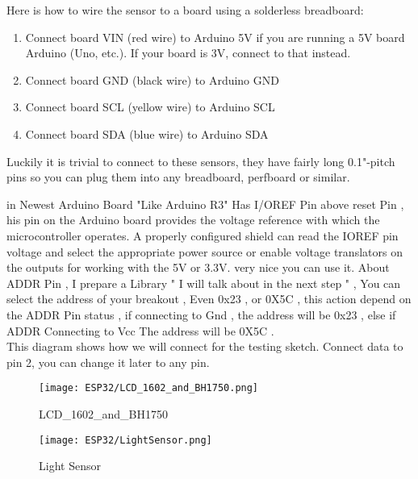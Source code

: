 Here is how to wire the sensor to a board using a solderless breadboard:
\begin{enumerate}
	\item Connect board VIN (red wire) to Arduino 5V if you are running a 5V board Arduino (Uno, etc.). If your board is 3V, connect to that instead.
	\item Connect board GND (black wire) to Arduino GND
	\item Connect board SCL (yellow wire) to Arduino SCL
	\item Connect board SDA (blue wire) to Arduino SDA
\end{enumerate}




Luckily it is trivial to connect to these sensors, they have fairly long 0.1"-pitch pins so you can plug them into any breadboard, perfboard or similar.

in Newest  Arduino Board "Like Arduino R3" Has I/OREF Pin above reset Pin , his pin on the Arduino board provides the voltage reference with which the microcontroller operates. A properly configured shield can read the IOREF pin voltage and select the appropriate power source or enable voltage translators on the outputs for working with the 5V or 3.3V.  very nice you can use it. About ADDR Pin , I prepare a Library " I will talk about in the next step " , You can select the address of your breakout , Even 0x23 \cite{Cihan:2020} , or 0X5C , this action depend on the ADDR Pin status , if connecting to Gnd , the address will be 0x23 , else if ADDR Connecting to Vcc The address will be 0X5C  .
 \\

This diagram shows how we will connect for the testing sketch. Connect data to pin 2, you can change it later to any pin.

\begin{figure}  
	\begin{center}
		\texttt{[image: ESP32/LCD\_1602\_and\_BH1750.png]}
		\caption{LCD_1602_and_BH1750} 
		\label{fig:Python 3.10.}
	\end{center}
\end{figure}	



\begin{figure}  
	\begin{center}
		\texttt{[image: ESP32/LightSensor.png]}
		\caption{Light Sensor} 
		\label{fig:Python 3.10.}
	\end{center}
\end{figure}	

